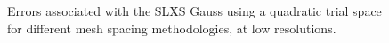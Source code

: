\begin{figure}[!htp]
\begin{center}
{}
\end{center}
\caption{Errors associated with the SLXS Gauss using a quadratic trial space for different mesh spacing methodologies, at low resolutions.}
\label{fig:low_res_gauss}
\end{figure}
%
%
